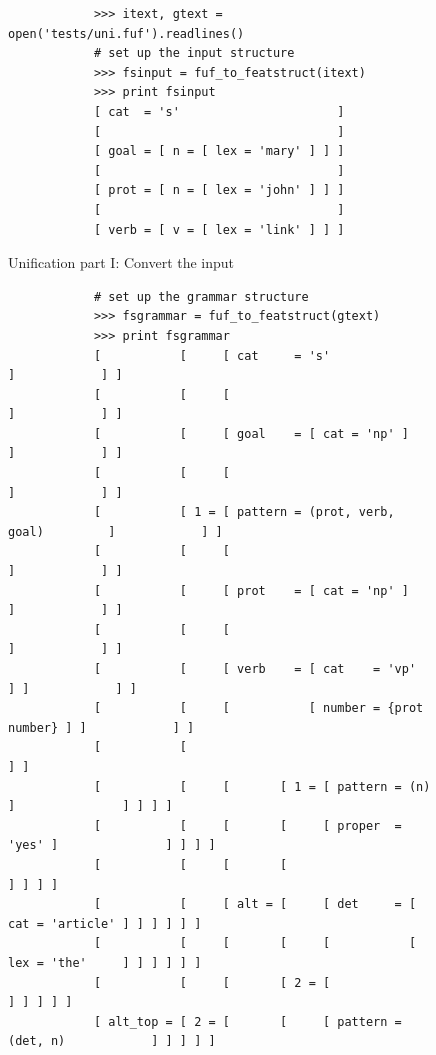\documentclass[12pt]{article}
\begin{document}
{\begin{figure}[h!]
    {\scriptsize
\begin{verbatim}
            >>> itext, gtext = open('tests/uni.fuf').readlines()
            # set up the input structure
            >>> fsinput = fuf_to_featstruct(itext)
            >>> print fsinput
            [ cat  = 's'                      ]
            [                                 ]
            [ goal = [ n = [ lex = 'mary' ] ] ]
            [                                 ]
            [ prot = [ n = [ lex = 'john' ] ] ]
            [                                 ]
            [ verb = [ v = [ lex = 'link' ] ] ]\end{verbatim}
}
\caption{Unification part I: Convert the input}
\label{fig:unification-one}
\end{figure}
\begin{figure}[h!]
    {\scriptsize
\begin{verbatim}
            # set up the grammar structure
            >>> fsgrammar = fuf_to_featstruct(gtext)
            >>> print fsgrammar
            [           [     [ cat     = 's'                        ]            ] ]
            [           [     [                                      ]            ] ]
            [           [     [ goal    = [ cat = 'np' ]             ]            ] ]
            [           [     [                                      ]            ] ]
            [           [ 1 = [ pattern = (prot, verb, goal)         ]            ] ]
            [           [     [                                      ]            ] ]
            [           [     [ prot    = [ cat = 'np' ]             ]            ] ]
            [           [     [                                      ]            ] ]
            [           [     [ verb    = [ cat    = 'vp'          ] ]            ] ]
            [           [     [           [ number = {prot number} ] ]            ] ]
            [           [                                                         ] ]
            [           [     [       [ 1 = [ pattern = (n)   ]               ] ] ] ]
            [           [     [       [     [ proper  = 'yes' ]               ] ] ] ]
            [           [     [       [                                       ] ] ] ]
            [           [     [ alt = [     [ det     = [ cat = 'article' ] ] ] ] ] ]
            [           [     [       [     [           [ lex = 'the'     ] ] ] ] ] ]
            [           [     [       [ 2 = [                               ] ] ] ] ]
            [ alt_top = [ 2 = [       [     [ pattern = (det, n)            ] ] ] ] ]

\end{verbatim}}
\end{figure}}
\end{document}

